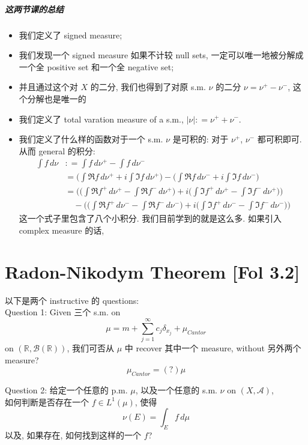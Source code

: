 \documentclass[lang=cn,11pt]{elegantbook}
\begin{document}
\paragraph*{这两节课的总结}
\begin{itemize}
    \item 我们定义了 signed measure;
    \item 我们发现一个 signed measure 如果不计较 null sets, 一定可以唯一地被分解成一个全 positive set 和一个全 negative set;
    \item 并且通过这个对 $X$ 的二分, 我们也得到了对原 s.m. $\nu$ 的二分 $\nu = \nu^+ - \nu^-$, 这个分解也是唯一的
    \item 我们定义了 total varation measure of a s.m., $|\nu| : = \nu^+ + \nu^-$.
    \item 我们定义了什么样的函数对于一个 s.m. $\nu$ 是可积的: 对于 $\nu^+$, $\nu^-$ 都可积即可. 从而 general 的积分: \begin{align*}
        \int f \,d\nu &: = \int f \,d \nu^+  - \int f \,d \nu^- \\ 
        & =  \bigg( \int \Re f \,d \nu^+ +   i  \int \Im f \,d \nu^+\bigg) -  \bigg( \int \Re f \,d \nu^- +   i  \int \Im f \,d \nu^- \bigg)    \\ 
        & = \bigg( \big(\int  \Re f^+ \,d \nu^+ -\int  \Re f^- \,d \nu^+  \big) + i\big(\int  \Im f^+ \,d \nu^+ -    \int  \Im f^- \,d \nu^+  \big) \bigg) \\ &\quad -
        \bigg( \big(\int  \Re f^+ \,d \nu^- -    \int  \Re f^- \,d \nu^-  \big) + i\big(\int  \Im f^+ \,d \nu^- -    \int  \Im f^- \,d \nu^-  \big) \bigg)
    \end{align*}
这一个式子里包含了八个小积分. 我们目前学到的就是这么多. 如果引入 complex measure 的话, 
 \end{itemize}




\chapter{Radon-Nikodym Theorem [Fol 3.2]}
以下是两个 instructive 的 questions:\\
Question 1: Given 三个 s.m. on 
\[
   \mu =   m +  \sum_{j=1}^\infty c_j \delta_{x_j} + \mu_{Cantor}
    \]
on $(\mathbb{R},\mathcal{B}(\mathbb{R}))$, 我们可否从 $\mu$ 中 recover 其中一个 measure, without 另外两个 measure?  
\[
 \mu_{Cantor} = (?) \mu
\]


Question 2: 给定一个任意的 p.m. $\mu$, 以及一个任意的 s.m. $\nu$ on $(X,\mathcal{A})$, \\
如何判断是否存在一个 $f \in L^1 (\mu)$, 使得 \[
\nu(E) = \int_E f \, d\mu
\]
以及, 如果存在, 如何找到这样的一个 $f$? 
\end{document}
